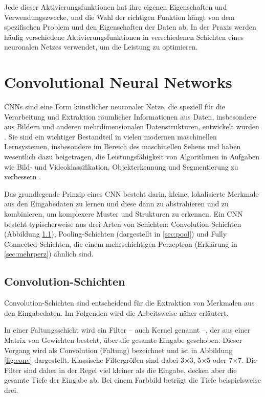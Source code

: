 Jede dieser Aktivierungsfunktionen hat ihre eigenen Eigenschaften und Verwendungszwecke, und die Wahl der richtigen Funktion hängt von dem spezifischen Problem und den Eigenschaften der Daten ab. In der Praxis werden häufig verschiedene Aktivierungsfunktionen in verschiedenen Schichten eines neuronalen Netzes verwendet, um die Leistung zu optimieren.
\section{Convolutional Neural Networks}
\label{sec:convnet}
CNNs sind eine Form künstlicher neuronaler Netze, die speziell für die Verarbeitung und Extraktion räumlicher Informationen aus Daten, insbesondere aus Bildern und anderen mehrdimensionalen Datenstrukturen, entwickelt wurden \cite{8308186}.
Sie sind ein wichtiger Bestandteil in vielen modernen maschinellen Lernsystemen, insbesondere im Bereich des maschinellen Sehens und haben wesentlich dazu beigetragen, die Leistungsfähigkeit von Algorithmen in Aufgaben wie Bild- und Videoklassifikation, Objekterkennung und Segmentierung zu verbessern \cite{oshea2015introduction}.

Das grundlegende Prinzip eines CNN besteht darin, kleine, lokalisierte Merkmale aus den Eingabedaten zu lernen und diese dann zu abstrahieren und zu kombinieren, um komplexere Muster und Strukturen zu erkennen. Ein CNN besteht typischerweise aus drei Arten von Schichten: Convolution-Schichten (Abbildung \ref{sec:conv}), Pooling-Schichten (dargestellt in \ref{sec:pool}) und Fully Connected-Schichten, die einem mehrschichtigen Perzeptron (Erklärung in \ref{sec:mehrperz}) ähnlich sind.

\subsection{Convolution-Schichten}
\label{sec:conv}
Convolution-Schichten sind entscheidend für die Extraktion von Merkmalen aus den Eingabedaten. Im Folgenden wird die Arbeitsweise näher erläutert.

In einer Faltungsschicht wird ein Filter – auch Kernel genannt –, der aus einer Matrix von Gewichten besteht, über die gesamte Eingabe geschoben. Dieser Vorgang wird als Convolution (Faltung) bezeichnet und ist in Abbildung \ref{fig:conv} dargestellt. Klassische Filtergrößen sind dabei 3×3, 5×5 oder 7×7. Die Filter sind daher in der Regel viel kleiner als die Eingabe, decken aber die gesamte Tiefe der Eingabe ab. Bei einem Farbbild beträgt die Tiefe beispielsweise drei.

